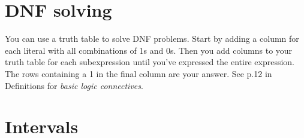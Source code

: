 \documentclass[twocolumn,a4paper]{article}
\begin{document}
\section*{DNF solving}
You can use a truth table to solve DNF problems.
Start by adding a column for each literal with all combinations of 1s and 0s.
Then you add columns to your truth table for each subexpression until you've expressed the entire expression.
The rows containing a 1 in the final column are your answer.
See p.12 in Definitions for \emph{basic logic connectives}.
\begin{figure}[ht]
	\centering
\end{figure}

\newpage
\section*{Intervals}
\end{document}
